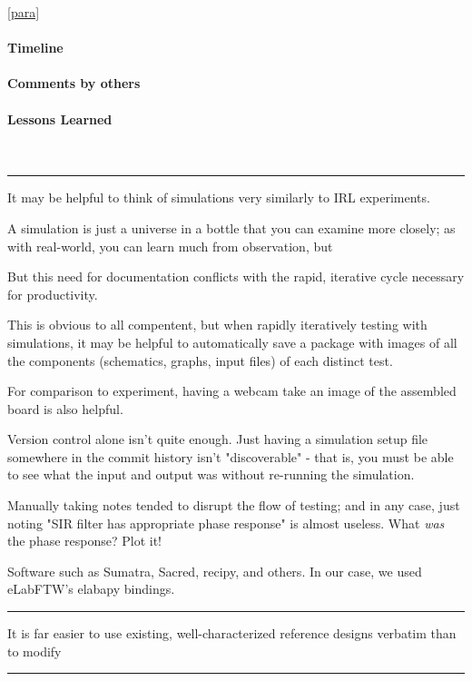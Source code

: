 \documentclass[fleqn,10pt]{article}
\begin{document}
\begin{multicols}{1}
\label{para}
\ref{para}

\paragraph{Timeline}

\paragraph{Comments by others}

\paragraph{Lessons Learned} \


\rule{\linewidth}{0.2pt}

It may be helpful to think of simulations very similarly to IRL experiments. 

A simulation is just a universe in a bottle that you can examine more closely; as with real-world, you can learn much from observation, but 

But this need for documentation conflicts with the rapid, iterative cycle necessary for productivity.

This is obvious to all compentent, but when rapidly iteratively testing with simulations, it may be helpful to automatically save a package with images of all the components (schematics, graphs, input files) of each distinct test. 

For comparison to experiment, having a webcam take an image of the assembled board is also helpful. 

Version control alone isn't quite enough. Just having a simulation setup file somewhere in the commit history isn't "discoverable" - that is, you must be able to see what the input and output was without re-running the simulation. 

Manually taking notes tended to disrupt the flow of testing; and in any case, just noting "SIR filter has appropriate phase response" is almost useless. What {\it was} the phase response? Plot it!

Software such as Sumatra, Sacred, recipy, and others. In our case, we used eLabFTW's elabapy bindings.

\rule{\linewidth}{0.2pt}

It is far easier to use existing, well-characterized reference designs verbatim than to modify 

\rule{\linewidth}{0.2pt}


\end{multicols}
\end{document}

